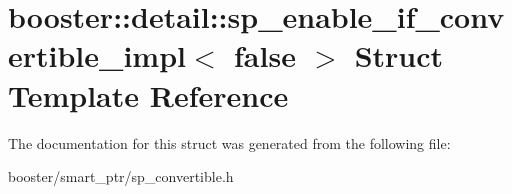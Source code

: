 \section{booster\-:\-:detail\-:\-:sp\-\_\-enable\-\_\-if\-\_\-convertible\-\_\-impl$<$ false $>$ Struct Template Reference}
\label{structbooster_1_1detail_1_1sp__enable__if__convertible__impl_3_01false_01_4}


The documentation for this struct was generated from the following file\-:\begin{DoxyCompactItemize}
\item 
booster/smart\-\_\-ptr/sp\-\_\-convertible.\-h\end{DoxyCompactItemize}
